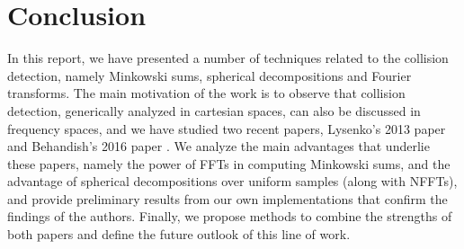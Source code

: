\documentclass[letterpaper, 10 pt, conference]{ieeeconf}
\begin{document}
\section{Conclusion}

In this report, we have presented a number of techniques related to the collision detection, namely
Minkowski sums, spherical decompositions and Fourier transforms. The main motivation of the work
is to observe that collision detection, generically analyzed in cartesian spaces, can also be 
discussed in frequency spaces, and we have studied two recent papers, Lysenko's 2013 paper \cite{lysenko2013fourier}
and Behandish's 2016 paper \cite{behandish2016analytic}. We analyze the main advantages that
underlie these papers, namely the power of FFTs in computing Minkowski sums, and the advantage of 
spherical decompositions over uniform samples (along with NFFTs), and provide preliminary
results from our own implementations that confirm the findings of the authors. Finally, we 
propose methods to combine the strengths of both papers and define the future outlook of this
line of work.



\end{document}
